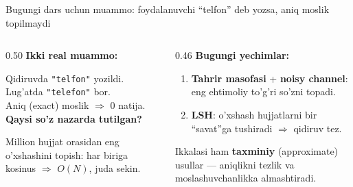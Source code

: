 \documentclass[aspectratio=169,11pt]{beamer}
\begin{document}
\begin{frame}{Bugungi dars uchun muammo: foydalanuvchi ``telfon'' deb yozsa, aniq moslik topilmaydi}
  \begin{columns}[T]
    \begin{column}{0.50\textwidth}
      \textbf{Ikki real muammo:}\\[4pt]
      \small
      \begin{tcolorbox}[warnbox,title=1. Imlo xatosi,top=2pt,bottom=2pt]
        \footnotesize
        Qidiruvda \texttt{"telfon"} yozildi.\\
        Lug'atda \texttt{"telefon"} bor.\\
        Aniq (exact) moslik $\Rightarrow$ \alert{0 natija}.\\
        \textbf{Qaysi so'z nazarda tutilgan?}
      \end{tcolorbox}
      \vspace{3pt}
      \begin{tcolorbox}[warnbox,title=2. Sekin qidiruv,top=2pt,bottom=2pt]
        \footnotesize
        Million hujjat orasidan eng o'xshashini topish:
        har biriga kosinus $\Rightarrow$ $O(N)$, juda sekin.
      \end{tcolorbox}
    \end{column}
    \begin{column}{0.46\textwidth}
      \textbf{Bugungi yechimlar:}\\[4pt]
      \small
      \begin{enumerate}\setlength\itemsep{4pt}
        \item \textbf{Tahrir masofasi} + \textbf{noisy channel}:
              eng ehtimoliy to'g'ri so'zni topadi.
        \item \textbf{LSH}: o'xshash hujjatlarni bir ``savat''ga
              tushiradi $\Rightarrow$ qidiruv tez.
      \end{enumerate}
      \vspace{5pt}
      \begin{tcolorbox}[okbox,top=2pt,bottom=2pt]
        \footnotesize
        Ikkalasi ham \textbf{taxminiy} (approximate) usullar ---
        aniqlikni tezlik va moslashuvchanlikka almashtiradi.
      \end{tcolorbox}
    \end{column}
  \end{columns}
\end{frame}
\end{document}
